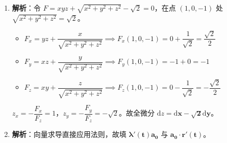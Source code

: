 \documentclass[lang=cn,11pt]{elegantbook}
\begin{document}
\begin{solution}
\begin{enumerate}
  \item \textbf{解析}：令 $F = xyz+\sqrt{x^2+y^2+z^2}-\sqrt{2} = 0$，在点 $(1,0,-1)$ 处 $\sqrt{x^2+y^2+z^2} = \sqrt{2}$。
  \begin{itemize}
    \item $F_x = yz + \dfrac{x}{\sqrt{x^2+y^2+z^2}} \implies F_x(1,0,-1) = 0 + \dfrac{1}{\sqrt{2}} = \dfrac{\sqrt{2}}{2}$
    \item $F_y = xz + \dfrac{y}{\sqrt{x^2+y^2+z^2}} \implies F_y(1,0,-1) = -1 + 0 = -1$
    \item $F_z = xy + \dfrac{z}{\sqrt{x^2+y^2+z^2}} \implies F_z(1,0,-1) = 0 - \dfrac{1}{\sqrt{2}} = -\dfrac{\sqrt{2}}{2}$
  \end{itemize}
  $z_x = -\dfrac{F_x}{F_z} = 1$，$z_y = -\dfrac{F_y}{F_z} = -\sqrt{2}$。故全微分 $\mathrm{d}z = \mathbf{\mathrm{d}x - \sqrt{2}\mathrm{d}y}$。
  
  \item \textbf{解析}：向量求导直接应用法则，故填 $\mathbf{\lambda'(t)\boldsymbol a_0}$ 与 $\mathbf{\boldsymbol a_0\cdot\boldsymbol r'(t)}$。
\end{enumerate}
\end{solution}
\end{document}
